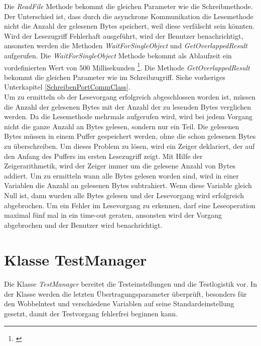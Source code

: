 Die \textit{ReadFile} Methode bekommt die gleichen Parameter wie die Schreibmethode. Der Unterschied ist, dass durch die asynchrone Kommunikation die Lesemethode nicht die Anzahl der gelesenen Bytes speichert, weil diese verfälscht sein könnten. Wird der Lesezugriff Fehlerhaft ausgeführt, wird der Benutzer benachrichtigt, ansonsten werden die Methoden \textit{WaitForSingleObject} und \textit{GetOverlappedResult} aufgerufen. Die \textit{WaitForSingleObject} Methode bekommt als Ablaufzeit ein vordefinierten Wert von 500 Millisekunden \footnote{\cite{SerialCommunications}}. Die Methode \textit{GetOverlappedResult} bekommt die gleichen Parameter wie im Schreibzugriff. Siehe vorheriges Unterkapitel \ref{SchreibenPortCommClass}. \\

Um zu ermitteln ob der Lesevorgang erfolgreich abgeschlossen worden ist, müssen die Anzahl der gelesenen Bytes mit der Anzahl der zu lesenden Bytes verglichen werden. Da die Lesemethode mehrmals aufgerufen wird, wird bei jedem Vorgang nicht die ganze Anzahl an Bytes gelesen, sondern nur ein Teil. Die gelesenen Bytes müssen in einem Puffer gespeichert werden, ohne die schon gelesenen Bytes zu überschreiben. Um dieses Problem zu lösen, wird ein Zeiger deklariert, der auf den Anfang des Puffers im ersten Lesezugriff zeigt. Mit Hilfe der Zeigerarithmetik, wird der Zeiger immer um die gelesene Anzahl von Bytes addiert. Um zu ermitteln wann alle Bytes gelesen worden sind, wird in einer Variablen die Anzahl an gelesenen Bytes subtrahiert. Wenn diese Variable gleich Null ist, dann wurden alle Bytes gelesen und der Lesevorgang wird erfolgreich abgebrochen. Um ein Fehler im Lesevorgang zu erkennen, darf eine Leseoperation maximal fünf mal in ein time-out geraten, ansonsten wird der Vorgang abgebrochen und der Benutzer wird benachrichtigt.



\newpage


\section{Klasse TestManager}
\paragraph{}
Die Klasse \textit{TestManager} bereitet die Testeinstellungen und die Testlogistik vor. In der Klasse werden die letzten Übertragungsparameter überprüft, besonders für den Wobbelntest und verschiedene Variablen auf seine Standardeinstellung gesetzt, damit der Testvorgang fehlerfrei beginnen kann.


